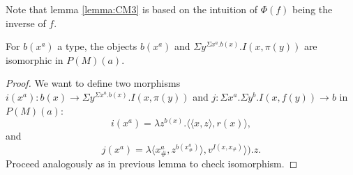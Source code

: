 \begin{remark}
  Note that lemma \ref{lemma:CM3} is based on the intuition of $\Phi(f)$ being the inverse of $f$. 
\end{remark}

\begin{lemma}\label{lemma:CM4}
  For $b(x^a)$ a type, the objects $b(x^a)$ and $\Sigma y^{\Sigma x^a.b(x)}. I(x,\pi(y))$ are isomorphic in $P(M)(a)$.
\end{lemma}
\begin{proof}
  We want to define two morphisms $i(x^a):b(x) \to\Sigma y^{\Sigma x^a.b(x)}. I(x,\pi(y))$ and $j:\Sigma x^a. \Sigma y^b. I(x,f(y)) \to b$ in $P(M)(a)$:
  $$i(x^a) = \lambda z^{b(x)}. \langle\langle x, z\rangle, r(x) \rangle,$$
  and
  $$j(x^a) = \lambda \langle x_\#^a, z^{b(x_\#^a)} \rangle, v^{I(x,x_\#)}\rangle). z .$$
  Proceed analogously as in previous lemma to check isomorphism. 
\end{proof}



